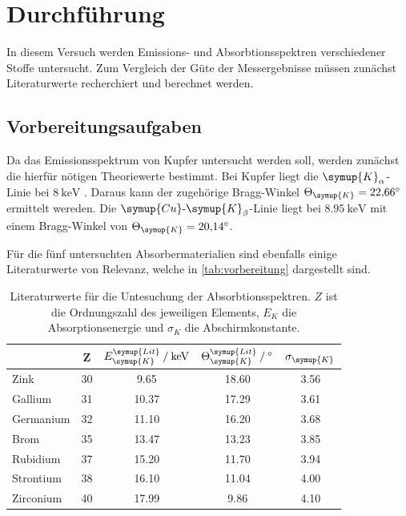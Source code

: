 \section{Durchführung}
\label{sec:Durchführung}
In diesem Versuch werden Emissions- und Absorbtionsspektren verschiedener Stoffe untersucht.
Zum Vergleich der Güte der Messergebnisse müssen zunächst Literaturwerte recherchiert und berechnet werden. 
\subsection{Vorbereitungsaufgaben}
\label{subsec:vorbereitung}
Da das Emissionsspektrum von Kupfer untersucht werden soll, werden zunächst die hierfür nötigen Theoriewerte bestimmt.
Bei Kupfer liegt die $\symup{K}_\alpha$-Linie bei $\qty{8}{\kilo\electronvolt}$ \cite{NIST}. Daraus kann der zugehörige Bragg-Winkel $\Theta_{\symup{K}} = \qty{22.66}{\degree}$ 
ermittelt wereden. Die $\symup{Cu}\text{-}\symup{K}_{\beta}$-Linie liegt bei $\qty{8.95}{\kilo\electronvolt}$ mit einem Bragg-Winkel von $\Theta_{\symup{K}} = \qty{20.14}{\degree}$.

Für die fünf untersuchten Absorbermaterialien sind ebenfalls einige Literaturwerte von Relevanz, welche in \autoref{tab:vorbereitung} dargestellt sind.
\begin{table}
    \centering
    \caption{Literaturwerte für die Untesuchung der Absorbtionsspektren. $Z$ ist die Ordnungszahl des jeweiligen Elements, $E_K$ die Absorptionsenergie und $\sigma_K$
    die Abschirmkonstante. \cite{NIST}}
    \label{tab:vorbereitung}
    \begin{tabular}{l c S S S}
        \toprule
         & Z & {$E_{\symup{K}}^{\symup{Lit}} \mathbin{/} \unit{\kilo\electronvolt}$} & {$\Theta_{\symup{K}}^{\symup{Lit}} \mathbin{/} \unit{\degree}$} & {$\sigma_{\symup{K}}$} \\
        \midrule
        Zink         & 30 &  9.65 & 18.60 & 3.56 \\
        Gallium      & 31 & 10.37 & 17.29 & 3.61 \\
        Germanium    & 32 & 11.10 & 16.20 & 3.68 \\
        Brom         & 35 & 13.47 & 13.23 & 3.85 \\
        Rubidium     & 37 & 15.20 & 11.70 & 3.94 \\
        Strontium    & 38 & 16.10 & 11.04 & 4.00 \\
        Zirconium    & 40 & 17.99 &  9.86 & 4.10 \\
    \bottomrule
    \end{tabular}
\end{table}
